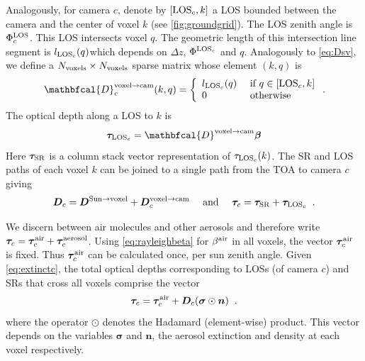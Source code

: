 \documentclass[10pt,letterpaper]{article}
\newcommand{\OpDistance}{\mathbfcal{D}}
\newcommand{\vect}[1]{\bm{#1}}
\begin{document}
Analogously, for camera $c$, denote by $[{\rm LOS}_c,k]$ a LOS bounded
between the camera and the center of voxel $k$ (see
\cref{fig:groundgrid}).  The LOS zenith angle is $\Phi^{\rm LOS}_c$.
This LOS intersects voxel $q$. The geometric length of this
intersection line segment is $l_{\rm LOS_c}(q)$which depends on
$\Delta z$, $\Phi^{{\rm LOS}_c}$ and $q$.  Analogously to
\cref{eq:Dsv}, we define a $N_{\rm voxels}\times N_{\rm voxels}$
sparse matrix whose element $(k,q)$ is
\begin{equation}
  \OpDistance^{\mathrm{voxel \rightarrow cam}}_c(k,q) =
  \left\{
    \begin{array}{ll}
      l_{{\rm LOS}_c}(q) & \mbox{ if $q \in[{\rm LOS}_c,k]$} \\
      0  & \mbox{ otherwise}
      \label{eq:Dvc}
    \end{array}
  \right.
  .
  \hspace{-0.05cm}
\end{equation}
The optical depth along a LOS to $k$ is
\begin{equation}
  \vect{\tau}_{{\rm LOS}_c} = \OpDistance^{\mathrm{voxel \rightarrow
      cam}} \vect{\beta}
  \label{eq:lLOSn}
\end{equation}
Here $\vect{\tau}_{\rm SR}$ is a column stack vector representation of
$\tau_{{\rm LOS}_c}(k)$.  The SR and LOS paths of each voxel $k$ can
be joined to a single path from the TOA to camera $c$ giving
\begin{equation}
  {\bm D}_c=
  {\bm D}^{\mathrm{Sun \rightarrow voxel}}+
  {\bm D}^{\mathrm{voxel \rightarrow cam}}_c
  \quad\text{ and }\quad
  \vect{\tau}_c=
  \vect{\tau}_{\rm SR}+
  \vect{\tau}_{{\rm LOS}_c}
  \;\;.
  \label{eq:D_tau_total}
\end{equation}

We discern between air molecules and other aerosols and therefore
write $ \vect{\tau}_c= \vect{\tau}_c^{\rm air} + \vect{\tau}_c^{\rm
  aerosol}$.  Using \cref{eq:rayleighbeta} for $\beta^{\rm air}$ in
all voxels, the vector $\vect{\tau}_c^{\rm air}$ is fixed. Thus
$\vect{\tau}_c^{\rm air}$ can be calculated once, per sun zenith
angle. Given \cref{eq:extinctc}, the total optical depths
corresponding to LOSs (of camera $c$) and SRs that cross all voxels
comprise the vector
\begin{equation}
  \vect{\tau}_c= \vect{\tau}_c^{\rm air}
  + {\bm D}_c (\vect{\sigma} \odot {\bm n})
  \;\;.
  \label{eq:tautotal}
\end{equation}
where the operator $\odot$ denotes the Hadamard (element-wise)
product. This vector depends on the variables $\vect{\sigma}$ and
${\bm n}$, the aerosol extinction and density at each voxel
respectively.
\end{document}

